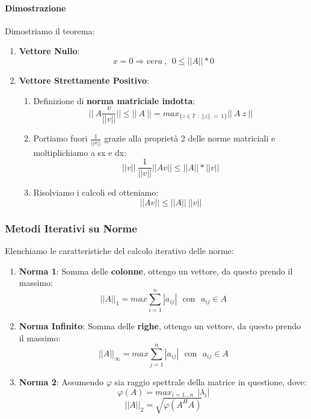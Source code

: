 \documentclass{article}
\begin{document}
\paragraph{Dimostrazione} Dimostriamo il teorema:

\begin{enumerate}
    \item \textbf{Vettore Nullo}:
    \[ x=0 \Rightarrow vera \: , \: \: 0 \leq ||A|| * 0 \]
    \item \textbf{Vettore Strettamente Positivo}:
    \begin{enumerate}
        \item Definizione di \textbf{norma matriciale indotta}:
        \[ ||\:A\frac{v}{||v||}|| \leq ||\:A\:|| = max_{\{ z \in \mathbb{F} \: : \: ||z|| \: = \: 1 \}} ||\:A\:z\:|| \]
        \item Portiamo fuori $\frac{1}{||x||}$ grazie alla proprietà 2 delle norme matriciali e moltiplichiamo a sx e dx:
        \[ ||v||\:\frac{1}{||v||}||A{v}|| \leq ||A|| * ||v|| \]
        \item Risolviamo i calcoli ed otteniamo:
        \[ \boxed{ ||A{v}|| \leq ||A|| \: ||v|| } \] 
    \end{enumerate}
\end{enumerate}

\subsubsection{Metodi Iterativi su Norme}

Elenchiamo le caratteristiche del calcolo iterativo delle norme:

\begin{enumerate}
    \item \textbf{Norma 1}: Somma delle \textbf{colonne}, ottengo un vettore, da questo prendo il massimo:
    \[ \boxed{||A||_{1} = max\sum^{n}_{i=1}|a_{ij}| \: \: \: \text{con} \: \: \: a_{ij} \in A}\]
    \item \textbf{Norma Infinito}: Somma delle \textbf{righe}, ottengo un vettore, da questo prendo il massimo:
    \[ \boxed{||A||_{\infty} = max\sum^{n}_{j=1}|a_{ij}| \: \: \: \text{con} \: \: \: a_{ij} \in A}\]
    \item \textbf{Norma 2}: Assumendo $\varphi$ sia raggio spettrale della matrice in questione, dove: \[\varphi(A) = max_{i=1...n} \: \:|\lambda_{i}|\]
    \vspace*{3px}
    \[ \boxed{||A||_{2} = \sqrt{\varphi(A^{H}A)}} \]
\end{enumerate}
\end{document}
